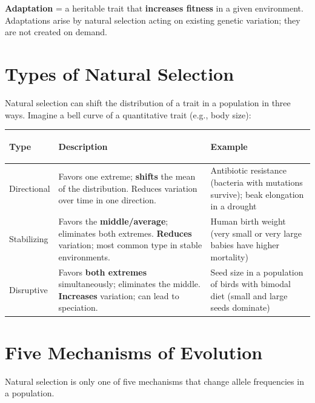 \documentclass[11pt, letterpaper]{article}
\begin{document}
\textbf{Adaptation} = a heritable trait that \textbf{increases fitness} in a given environment.
Adaptations arise by natural selection acting on existing genetic variation; they are not
created on demand.

\section*{Types of Natural Selection}

Natural selection can shift the distribution of a trait in a population in three ways.
Imagine a bell curve of a quantitative trait (e.g., body size):

\noindent
{\renewcommand{\arraystretch}{1.6}
\begin{tabularx}{\textwidth}{>{\bfseries\raggedright\arraybackslash}p{3.5cm}
                              >{\raggedright\arraybackslash}X
                              >{\raggedright\arraybackslash}p{3.5cm}}
\toprule
\rowcolor{tableheadergreen}
\textbf{Type} & \textbf{Description} & \textbf{Example} \\
\midrule
\rowcolor{rowA}  Directional & Favors one extreme; \textbf{shifts} the mean of the distribution. Reduces variation over time in one direction. & Antibiotic resistance (bacteria with mutations survive); beak elongation in a drought \\
\rowcolor{rowBg} Stabilizing & Favors the \textbf{middle/average}; eliminates both extremes. \textbf{Reduces} variation; most common type in stable environments. & Human birth weight (very small or very large babies have higher mortality) \\
\rowcolor{rowA}  Disruptive  & Favors \textbf{both extremes} simultaneously; eliminates the middle. \textbf{Increases} variation; can lead to speciation. & Seed size in a population of birds with bimodal diet (small and large seeds dominate) \\
\bottomrule
\end{tabularx}}

\section*{Five Mechanisms of Evolution}

Natural selection is only one of five mechanisms that change allele frequencies in a population.
\end{document}
